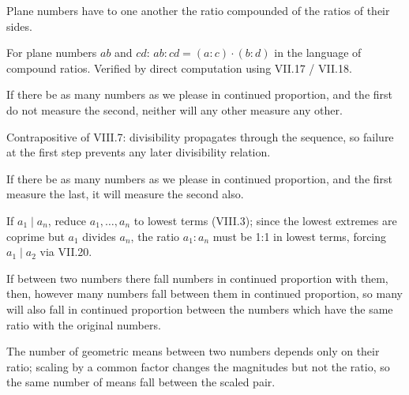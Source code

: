 \documentclass{rrxiv}
\begin{document}
\begin{claim}
\label{prop:VIII.5}
Plane numbers have to one another the ratio compounded of the ratios
of their sides.
\end{claim}
\begin{evidence}
\label{ev:VIII.5}
For plane numbers $ab$ and $cd$: $ab : cd = (a : c) \cdot (b : d)$
in the language of compound ratios.  Verified by direct computation
using VII.17 / VII.18.
\end{evidence}

\begin{claim}
\label{prop:VIII.6}
If there be as many numbers as we please in continued proportion, and
the first do not measure the second, neither will any other measure
any other.
\end{claim}
\begin{evidence}
\label{ev:VIII.6}
Contrapositive of VIII.7: divisibility propagates through the
sequence, so failure at the first step prevents any later
divisibility relation.
\end{evidence}

\begin{claim}
\label{prop:VIII.7}
If there be as many numbers as we please in continued proportion, and
the first measure the last, it will measure the second also.
\end{claim}
\begin{evidence}
\label{ev:VIII.7}
If $a_1 \mid a_n$, reduce $a_1, \dots, a_n$ to lowest terms (VIII.3);
since the lowest extremes are coprime but $a_1$ divides $a_n$, the
ratio $a_1 : a_n$ must be 1:1 in lowest terms, forcing $a_1 \mid
a_2$ via VII.20.
\end{evidence}

\begin{claim}
\label{prop:VIII.8}
If between two numbers there fall numbers in continued proportion
with them, then, however many numbers fall between them in continued
proportion, so many will also fall in continued proportion between
the numbers which have the same ratio with the original numbers.
\end{claim}
\begin{evidence}
\label{ev:VIII.8}
The number of geometric means between two numbers depends only on
their ratio; scaling by a common factor changes the magnitudes but
not the ratio, so the same number of means fall between the scaled
pair.
\end{evidence}
\end{document}
